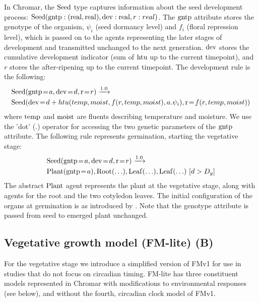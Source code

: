 In Chromar, the \(\mathrm{Seed}\) type captures information about the seed
development process:
\(\mathrm{Seed}(\mathrm{gntp}:(\mathrm{real},\mathrm{real}),\mathrm{dev}:\mathrm{real},r:real)\).  The
\(\mathrm{gntp}\) attribute stores the genotype of the organism, \(\psi_{i}\) (seed
dormancy level) and \(f_{i}\) (floral repression level), which is passed on to
the agents representing the later stages of development and transmitted
unchanged to the next generation.  \(\mathrm{dev}\) stores the cumulative
development indicator (sum of \(\mathrm{htu}\) up to the current timepoint), and
\(r\) stores the after-ripening up to the current timepoint. The development
rule is the following:
\begin{equation*}
\begin{split}
& \mr{Seed}(\ar{gntp}{a}, \ar{dev}{d}, \ar{r}{r}) \xrightarrow{1.0} \\ 
&\mr{Seed}(\ar{dev}{d + htu(temp, moist, f(r,temp,moist), a.\psi_i)}, 
\ar{r}{f(r, temp, moist)})
\end{split}
\end{equation*}
where \(\mathrm{temp}\) and \(\mathrm{moist}\) are fluents describing
temperature and moisture. We use the 'dot' (\(.\)) operator for
accessing the two genetic parameters of the \(\mathrm{gntp}\) attribute.
The following rule represents germination, starting the vegetative
stage:
\begin{equation*}
\begin{split}
& \mr{Seed}(\ar{gntp}{a},\ar{dev}{d},\ar{r}{r} ) \xrightarrow{1.0} \\
& \mr{Plant}(\ar{gntp}{a}), \mr{Root}(\ldots),\mr{Leaf}( \ldots ), \mr{Leaf}(\ldots) \, \, \lbrack d > D_{g}\rbrack
\end{split}
\end{equation*}
The abstract \(\mathrm{Plant}\) agent represents the plant at the vegetative stage,
along with agents for the root and the two cotyledon leaves. The initial
configuration of the organs at germination is as introduced by
\citet{chew_multiscale_2014}. Note that the genotype attribute is passed from
seed to emerged plant unchanged.

\subsection{Vegetative growth model (FM-lite) (B)}
\label{vegetative-growth-model-fm-lite-b}
For the vegetative stage we introduce a simplified version of FMv1
\citep{chew_multiscale_2014} for use in studies that do not focus on circadian
timing. FM-lite has three constituent models represented in Chromar with
modifications to environmental responses (see below), and without the fourth,
circadian clock model of FMv1.

